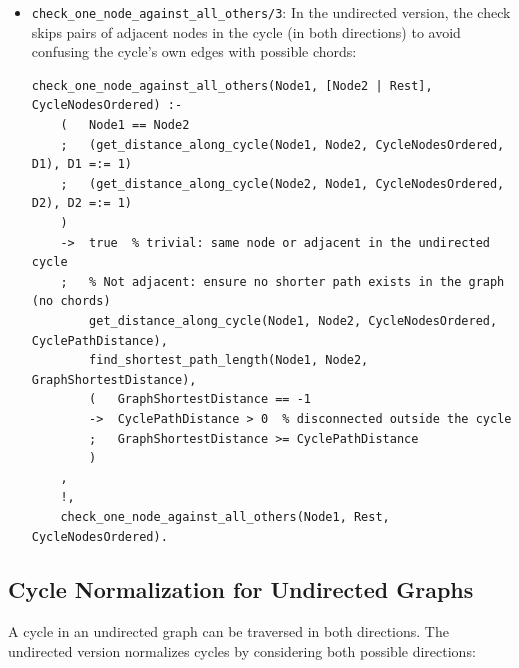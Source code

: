 \documentclass[12pt,a4paper]{article}
\begin{document}
\begin{itemize}
\item \texttt{check\_one\_node\_against\_all\_others/3}: In the undirected version, the check skips pairs of adjacent nodes in the cycle (in both directions) to avoid confusing the cycle's own edges with possible chords:

\begin{lstlisting}[style=prologstyle, basicstyle=\ttfamily\footnotesize]
check_one_node_against_all_others(Node1, [Node2 | Rest], CycleNodesOrdered) :-
    (   Node1 == Node2
    ;   (get_distance_along_cycle(Node1, Node2, CycleNodesOrdered, D1), D1 =:= 1)
    ;   (get_distance_along_cycle(Node2, Node1, CycleNodesOrdered, D2), D2 =:= 1)
    )
    ->  true  % trivial: same node or adjacent in the undirected cycle
    ;   % Not adjacent: ensure no shorter path exists in the graph (no chords)
        get_distance_along_cycle(Node1, Node2, CycleNodesOrdered, CyclePathDistance),
        find_shortest_path_length(Node1, Node2, GraphShortestDistance),
        (   GraphShortestDistance == -1
        ->  CyclePathDistance > 0  % disconnected outside the cycle
        ;   GraphShortestDistance >= CyclePathDistance
        )
    ,
    !,
    check_one_node_against_all_others(Node1, Rest, CycleNodesOrdered).
\end{lstlisting}
\end{itemize}

\subsection{Cycle Normalization for Undirected Graphs}
A cycle in an undirected graph can be traversed in both directions. The undirected version normalizes cycles by considering both possible directions:
\end{document}
